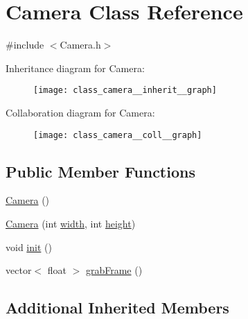 \hypertarget{class_camera}{\section{Camera Class Reference}
\label{class_camera}
}


{\ttfamily \#include $<$Camera.\-h$>$}



Inheritance diagram for Camera\-:\nopagebreak
\begin{figure}[H]
\begin{center}
\leavevmode
\texttt{[image: class\_camera\_\_inherit\_\_graph]}
\end{center}
\end{figure}


Collaboration diagram for Camera\-:\nopagebreak
\begin{figure}[H]
\begin{center}
\leavevmode
\texttt{[image: class\_camera\_\_coll\_\_graph]}
\end{center}
\end{figure}
\subsection*{Public Member Functions}
\begin{DoxyCompactItemize}
\item 
\hyperlink{class_camera_a01f94c3543f56ede7af49dc778f19331}{Camera} ()
\item 
\hyperlink{class_camera_ab8bd59938caefc7935fda5f5cfcb7a75}{Camera} (int \hyperlink{class_camera___a_abe6c7a2c84c368e8e8dd366444490953}{width}, int \hyperlink{class_camera___a_af2d2b7eedefafea58af3467325f4214e}{height})
\item 
void \hyperlink{class_camera_af930ce1f46c9f5af3bd5e5bbff6b5022}{init} ()
\item 
vector$<$ float $>$ \hyperlink{class_camera_a3374922c6e19f1174c469fbb7d0c7a03}{grab\-Frame} ()
\end{DoxyCompactItemize}
\subsection*{Additional Inherited Members}


